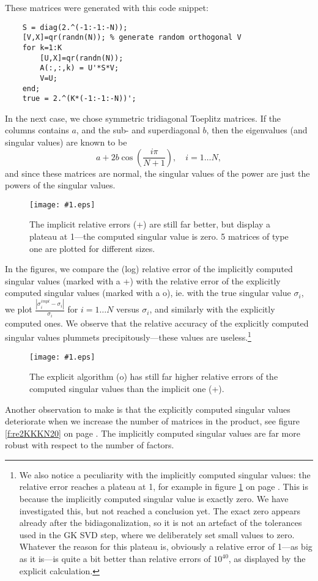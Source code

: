 \documentclass[11pt]{article}
\newcommand{\mypic}[2]
{
\begin{figure}[tbhp] 
       \centering
	\texttt{[image: \#1.eps]}
       \caption{\label{f:#1}#2}
 \end{figure} 
}
\begin{document}
These matrices were generated with this code snippet:
\begin{lstlisting}
	S = diag(2.^(-1:-1:-N));
	[V,X]=qr(randn(N));	% generate random orthogonal V
	for k=1:K
		[U,X]=qr(randn(N));
		A(:,:,k) = U'*S*V;
		V=U;
	end;
	true = 2.^(K*(-1:-1:-N))';
 \end{lstlisting}

In the next case, we chose symmetric tridiagonal Toeplitz matrices. If the columns contains $a$, and the sub- and superdiagonal $b$, then the eigenvalues (and singular values) are known to be
\[
	a + 2b\cos\left(\frac{i\pi}{N+1}\right), \quad i=1\ldots N,
\]
and since these matrices are normal, the singular values of the power are just the powers of the singular values.

\mypic{re1K5NNN}{The implicit relative errors (+) are still far better, but display a plateau at 1---the computed singular value is zero. 5 matrices of type one are plotted for different sizes.}

In the figures, we compare the (log) relative error of the implicitly computed singular values (marked with a +) with the relative error of the explicitly computed singular values (marked with a o), ie. with the true singular value $\sigma_i$, we plot $\frac{|\sigma_i^{impl} - \sigma_i|}{\sigma_i}$ for $i=1\ldots N$ versus $\sigma_i$, and similarly with the explicitly computed ones. We observe that the relative accuracy of the explicitly computed singular values plummets precipitously---these values are useless.\footnote{We also notice a peculiarity with the implicitly computed singular values: the relative error reaches a plateau at 1, for example in figure \ref{f:re1K5NNN} on page \pageref{f:re1K5NNN}. This is because the implicitly computed singular value is exactly zero. We have investigated this, but not reached a conclusion yet. The exact zero appears already after the bidiagonalization, so it is not an artefact of the tolerances used in the GK SVD step, where we deliberately set small values to zero. Whatever the reason for this plateau is, obviously a relative error of 1---as big as it is---is quite a bit better than relative errors of $10^{40}$, as displayed by the explicit calculation.}

\mypic{re2K21NNN}{The explicit algorithm (o) has still far higher relative errors of the computed singular values than the implicit one (+).}

Another observation to make is that the explicitly computed singular values deteriorate when we increase the number of matrices in the product, see figure \ref{f:re2KKKN20} on page \pageref{f:re2KKKN20}. The implicitly computed singular values are far more robust with respect to the number of factors.
\end{document}

